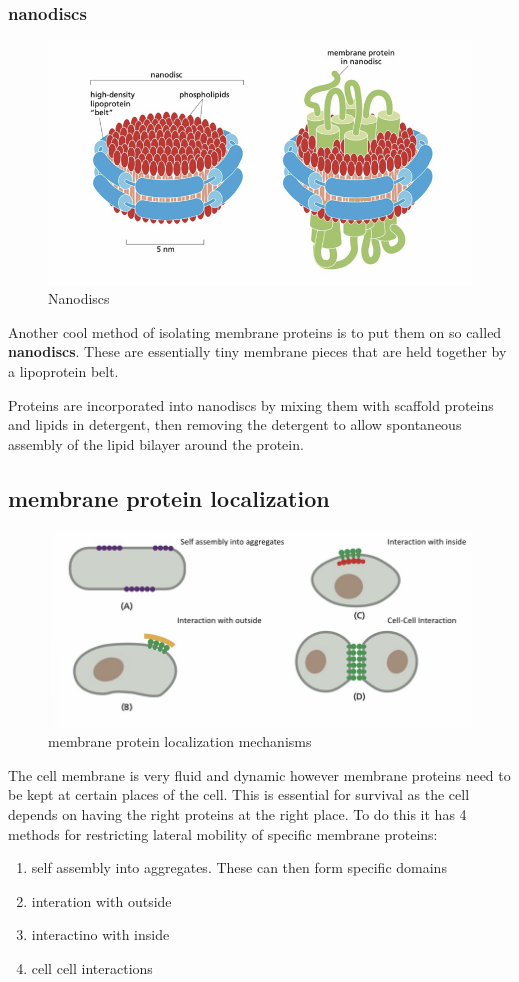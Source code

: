 \documentclass[../main.tex]{subfiles}
\begin{document}
\subsubsection{nanodiscs}
\begin{figure}[H]
    \centering
    \includegraphics[width=0.5\linewidth]{nanodiscs.png}
    \caption{Nanodiscs}
    \label{fig:enter-label}
\end{figure}
Another cool method of isolating membrane proteins is to put them on so called \textbf{nanodiscs}. These are essentially tiny membrane pieces that are held together by a lipoprotein belt. 
\par
Proteins are incorporated into nanodiscs by mixing them with scaffold proteins and lipids in detergent, then removing the detergent to allow spontaneous assembly of the lipid bilayer around the protein.

\subsection{membrane protein localization}
\begin{figure}[H]
    \centering
    \includegraphics[width=0.5\linewidth]{localization.png}
    \caption{membrane protein localization mechanisms}
    \label{fig:enter-label}
\end{figure}

The cell membrane is very fluid and dynamic however membrane proteins need to be kept at certain places of the cell. This is essential for survival as the cell depends on having the right proteins at the right place. To do this it has 4 methods for restricting lateral mobility of specific membrane proteins:

\begin{enumerate}
    \item self assembly into aggregates. These can then form specific domains
    \item interation with outside 
    \item interactino with inside
    \item cell cell interactions
\end{enumerate}
\end{document}
